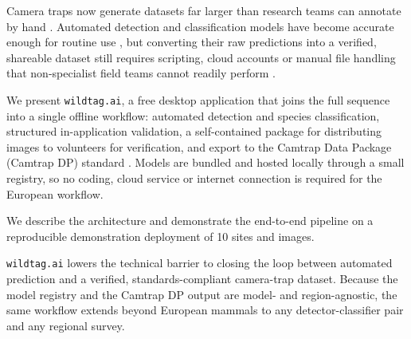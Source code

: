\documentclass[11pt]{article}
\begin{document}
\begin{meeabstract}

\item Camera traps now generate datasets far larger than research teams can
annotate by hand \cw. Automated detection and classification models have become
accurate enough for routine use \cw, but converting their raw predictions into a
verified, shareable dataset still requires scripting, cloud accounts or manual
file handling that non-specialist field teams cannot readily perform \cw.

\item We present \texttt{wildtag.ai}, a free desktop application that joins the
full sequence into a single offline workflow: automated detection and species
classification, structured in-application validation, a self-contained package
for distributing images to volunteers for verification, and export to the
Camtrap Data Package (Camtrap DP) standard \cw. Models are bundled and hosted
locally through a small registry, so no coding, cloud service or internet
connection is required for the European workflow.

\item We describe the architecture and demonstrate the end-to-end pipeline on a
reproducible demonstration deployment of 10 sites and  images.

\item \texttt{wildtag.ai} lowers the technical barrier to closing the loop
between automated prediction and a verified, standards-compliant camera-trap
dataset. Because the model registry and the Camtrap DP output are model- and
region-agnostic, the same workflow extends beyond European mammals to any
detector-classifier pair and any regional survey.

\end{meeabstract}

\end{document}
